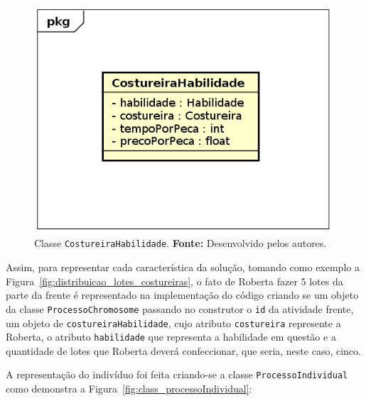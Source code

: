 \begin{figure}[h!]
	\centerline{\includegraphics[scale=0.5]{./imagens/costureiraHabilidade_class.png}}
	\caption[Classe \texttt{CostureiraHabilidade}.]
	{Classe \texttt{CostureiraHabilidade}. \textbf{Fonte:} Desenvolvido pelos
	autores.}
	\label{fig:class_costureiraHabilidade}
\end{figure}

\par Assim, para representar cada característica da solução, tomando como
exemplo a Figura~\ref{fig:distribuicao_lotes_costureiras}, o fato de Roberta
fazer 5 lotes da parte da frente é representado na implementação do código criando se um objeto da classe \texttt{ProcessoChromosome} passando no construtor o \texttt{id} da atividade frente, um objeto de
\texttt{costureiraHabilidade}, cujo atributo \texttt{costureira} represente a
Roberta, o atributo \texttt{habilidade} que representa a habilidade em questão e a
quantidade de lotes que Roberta deverá confeccionar, que seria, neste caso, cinco.

\par A representação do indivíduo foi feita criando-se a classe \texttt{ProcessoIndividual} 
como demonstra a Figura~\ref{fig:class_processoIndividual}:


